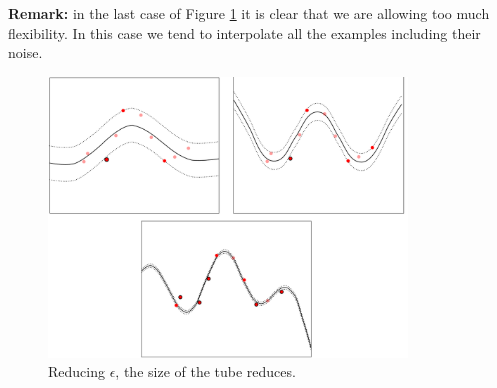 \textbf{Remark:} in the last case of Figure \ref{fig:svm_regression_decreasing_eps}
it is clear that we are allowing too much flexibility. In this case we tend to
interpolate all the examples including their noise.

\begin{figure}[H]
	\centering
	\includegraphics[width=0.85\textwidth]{
		images/14_NonLinearSVMs_regressionEpsilonValues.png
	}
	\caption{Reducing $\epsilon$, the size of the tube reduces.}
	\label{fig:svm_regression_decreasing_eps}
\end{figure}